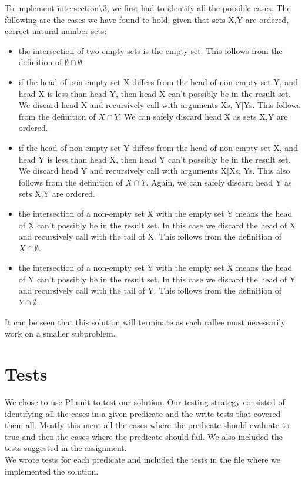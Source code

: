 \documentclass[]{article}
\begin{document}
To implement intersection\textbackslash3, we first had to identify all the possible cases. The following are the cases we have found to hold, given that sets X,Y are ordered, correct natural number sets:

\begin{itemize}
	\item the intersection of two empty sets is the empty set. This follows from the definition of $\emptyset \cap \emptyset$.
	\item if the head of non-empty set X differs from the head of non-empty set Y, and head X is less than head Y, then head X can't possibly be in the result set. We discard head X and recursively call with arguments Xs, Y$|$Ys. This follows from the definition of $X \cap Y$. We can safely discard head X as sets X,Y are ordered.
	\item if the head of non-empty set Y differs from the head of non-empty set X, and head Y is less than head X, then head Y can't possibly be in the result set. We discard head Y and recursively call with arguments X$|$Xs, Ys. This also follows from the definition of $X \cap Y$. Again, we can safely discard head Y as sets X,Y are ordered.
	\item the intersection of a non-empty set X with the empty set Y means the head of X can't possibly be in the result set. In this case we discard the head of X and recursively call with the tail of X. This follows from the definition of $X \cap \emptyset$.
	\item the intersection of a non-empty set Y with the empty set X means the head of Y can't possibly be in the result set. In this case we discard the head of Y and recursively call with the tail of Y. This follows from the definition of $Y \cap \emptyset$.

\end{itemize}

It can be seen that this solution will terminate as each callee must necessarily work on a smaller subproblem.\par

\section{Tests} %
\label{sec:tests}
We chose to use PLunit to test our solution. Our testing strategy consisted of identifying all the cases in a given predicate and the write tests that covered them all. Mostly this ment all the cases where the predicate should evaluate to true and then the cases where the predicate should fail. We also included the tests suggested in the assignment. \\
We wrote tests for each predicate and included the tests in the file where we implemented the solution. \\
\end{document}
